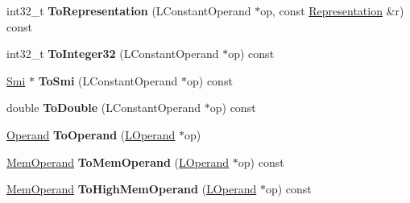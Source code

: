 \begin{DoxyCompactItemize}
\item 
int32\+\_\+t {\bfseries To\+Representation} (L\+Constant\+Operand $\ast$op, const \hyperlink{classv8_1_1internal_1_1_representation}{Representation} \&r) const \hypertarget{classv8_1_1internal_1_1_l_code_gen_a0e99f5084c7765aa53aa0537c112b4f1}{}\label{classv8_1_1internal_1_1_l_code_gen_a0e99f5084c7765aa53aa0537c112b4f1}

\item 
int32\+\_\+t {\bfseries To\+Integer32} (L\+Constant\+Operand $\ast$op) const \hypertarget{classv8_1_1internal_1_1_l_code_gen_a477ff533f07d93b0e1ca5f9290beea36}{}\label{classv8_1_1internal_1_1_l_code_gen_a477ff533f07d93b0e1ca5f9290beea36}

\item 
\hyperlink{classv8_1_1internal_1_1_smi}{Smi} $\ast$ {\bfseries To\+Smi} (L\+Constant\+Operand $\ast$op) const \hypertarget{classv8_1_1internal_1_1_l_code_gen_a9aa0394d9bdd7a07b4190d08edb0a8e6}{}\label{classv8_1_1internal_1_1_l_code_gen_a9aa0394d9bdd7a07b4190d08edb0a8e6}

\item 
double {\bfseries To\+Double} (L\+Constant\+Operand $\ast$op) const \hypertarget{classv8_1_1internal_1_1_l_code_gen_a9859cf602181324ec10970ab93416aaa}{}\label{classv8_1_1internal_1_1_l_code_gen_a9859cf602181324ec10970ab93416aaa}

\item 
\hyperlink{classv8_1_1internal_1_1_operand}{Operand} {\bfseries To\+Operand} (\hyperlink{classv8_1_1internal_1_1_l_operand}{L\+Operand} $\ast$op)\hypertarget{classv8_1_1internal_1_1_l_code_gen_aadfda9a2906fe2eea56eb9e3c2a4c054}{}\label{classv8_1_1internal_1_1_l_code_gen_aadfda9a2906fe2eea56eb9e3c2a4c054}

\item 
\hyperlink{classv8_1_1internal_1_1_mem_operand}{Mem\+Operand} {\bfseries To\+Mem\+Operand} (\hyperlink{classv8_1_1internal_1_1_l_operand}{L\+Operand} $\ast$op) const \hypertarget{classv8_1_1internal_1_1_l_code_gen_a3d306507f84e3e1d29c05a22d0c43248}{}\label{classv8_1_1internal_1_1_l_code_gen_a3d306507f84e3e1d29c05a22d0c43248}

\item 
\hyperlink{classv8_1_1internal_1_1_mem_operand}{Mem\+Operand} {\bfseries To\+High\+Mem\+Operand} (\hyperlink{classv8_1_1internal_1_1_l_operand}{L\+Operand} $\ast$op) const \hypertarget{classv8_1_1internal_1_1_l_code_gen_a9a04775e17692d63225c82752d5120f7}{}\label{classv8_1_1internal_1_1_l_code_gen_a9a04775e17692d63225c82752d5120f7}


\end{DoxyCompactItemize}
